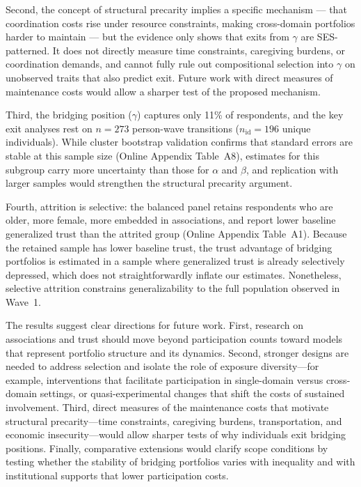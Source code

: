 Second, the concept of structural precarity implies a specific mechanism --- that coordination costs rise under resource constraints, making cross-domain portfolios harder to maintain --- but the evidence only shows that exits from $\gamma$ are SES-patterned. It does not directly measure time constraints, caregiving burdens, or coordination demands, and cannot fully rule out compositional selection into $\gamma$ on unobserved traits that also predict exit. Future work with direct measures of maintenance costs would allow a sharper test of the proposed mechanism.

Third, the bridging position ($\gamma$) captures only 11\% of respondents, and the key exit analyses rest on $n = 273$ person-wave transitions ($n_{\text{id}} = 196$ unique individuals). While cluster bootstrap validation confirms that standard errors are stable at this sample size (Online Appendix Table~A8), estimates for this subgroup carry more uncertainty than those for $\alpha$ and $\beta$, and replication with larger samples would strengthen the structural precarity argument.

Fourth, attrition is selective: the balanced panel retains respondents who are older, more female, more embedded in associations, and report lower baseline generalized trust than the attrited group (Online Appendix Table~A1). Because the retained sample has lower baseline trust, the trust advantage of bridging portfolios is estimated in a sample where generalized trust is already selectively depressed, which does not straightforwardly inflate our estimates. Nonetheless, selective attrition constrains generalizability to the full population observed in Wave~1.

The results suggest clear directions for future work. First, research on associations and trust should move beyond participation counts toward models that represent portfolio structure and its dynamics. Second, stronger designs are needed to address selection and isolate the role of exposure diversity—for example, interventions that facilitate participation in single-domain versus cross-domain settings, or quasi-experimental changes that shift the costs of sustained involvement. Third, direct measures of the maintenance costs that motivate structural precarity—time constraints, caregiving burdens, transportation, and economic insecurity—would allow sharper tests of why individuals exit bridging positions. Finally, comparative extensions would clarify scope conditions by testing whether the stability of bridging portfolios varies with inequality and with institutional supports that lower participation costs.

